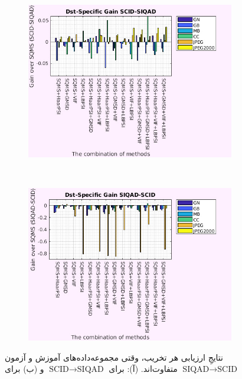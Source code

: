 \documentclass[twocolumn]{article}
\begin{document}
\begin{figure}
	\begin{subfigure}{0.47\textwidth}
		\includegraphics[width=\textwidth]{cross_SCID_SIQAD_dst}
		\caption{}
		\label{fig:scid_siqad_dst}
	\end{subfigure} \\
	\begin{subfigure}{0.47\textwidth}
		\includegraphics[width=\textwidth]{cross_SIQAD_SCID_dst}
		\caption{}
		\label{fig:siqad_scid_dst}
	\end{subfigure}
	\caption{نتایجِ ارزیابی هر تخریب، وقتی مجموعه‌داده‌های آموزش و آزمون متفاوت‌اند. (آ): برای $\text{SCID}\rightarrow \text{SIQAD}$ و (ب) برای $\text{SIQAD}\rightarrow \text{SCID}$}
	\label{fig:cross_dst}
\end{figure}
\end{document}
